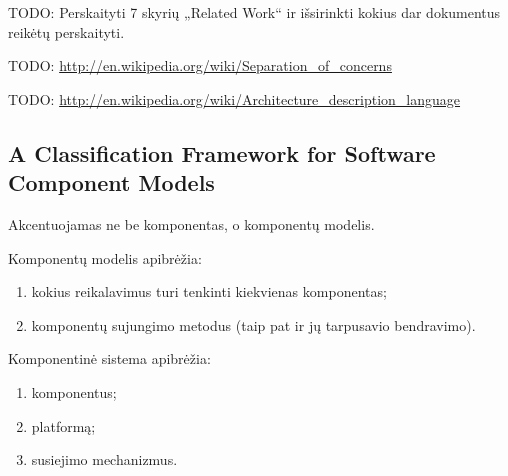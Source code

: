 TODO: Perskaityti \cite[18]{classification-framework-for-scm} 7 skyrių
„Related Work“ ir išsirinkti kokius dar dokumentus reikėtų perskaityti.

TODO: \url{http://en.wikipedia.org/wiki/Separation_of_concerns}

TODO: \url{http://en.wikipedia.org/wiki/Architecture_description_language}

\subsection{A Classification Framework for Software Component Models}

Akcentuojamas ne be komponentas, o komponentų modelis.

\begin{defn}
  Komponentų modelis apibrėžia:
  \begin{enumerate}
    \item kokius reikalavimus turi tenkinti kiekvienas komponentas;
    \item komponentų sujungimo metodus (taip pat ir jų tarpusavio
      bendravimo).
  \end{enumerate}
  \cite[2]{classification-framework-for-scm}
\end{defn}

\begin{defn}
  Komponentinė sistema apibrėžia:
  \begin{enumerate}
    \item komponentus;
    \item platformą;
    \item susiejimo mechanizmus.
  \end{enumerate}
  \cite[2]{classification-framework-for-scm}
\end{defn}
